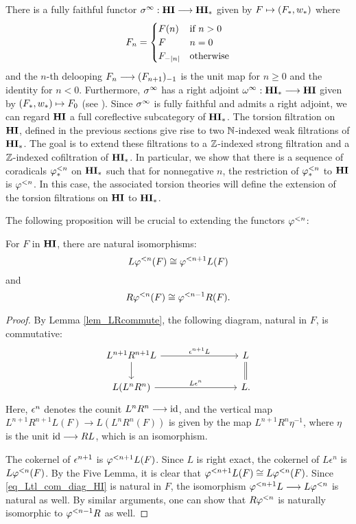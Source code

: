 There is a fully faithful functor $\spectHI: \HI \to \HM$ given
by $F \mapsto (F_*, \deloop_*)$ where
\[
F_n = \begin{cases}
F(n) &\textrm{if }n > 0 \\
F    &n = 0 \\
\RHI[|n|]F &\textrm{otherwise}
\end{cases}
\]
and the $n$-th delooping $F_n \to \RHI{(F_{n + 1})}$ is the unit
map for $n \geq 0$ and the identity for $n < 0$. Furthermore, 
$\spectHI$ has a right adjoint $\loopHM: \HM \to \HI$ given by 
$(F_*, \deloop_*) \mapsto F_0$ (see \cite[1.18]{DegModHom}). 
Since $\spectHI$ is fully faithful and admits a right adjoint, 
we can regard $\HI$ a full coreflective subcategory of $\HM$. The
torsion filtration on $\HI$, defined in the previous sections 
give rise to two $\N$-indexed weak filtrations of $\HM$. The goal 
is to extend these filtrations to a $\Z$-indexed strong filtration 
and a $\Z$-indexed cofiltration of $\HM$. In particular, we show
that there is a sequence of coradicals $\tlHM{n}$
on $\HM$ such that for nonnegative $n$, the restriction of 
$\tlHM{n}$ to $\HI$ is $\tlHI{n}$. In this case, the associated
torsion theories will define the extension of the torsion 
filtrations on $\HI$ to $\HM$.

The following proposition will be crucial to extending the 
functors $\tlHI{n}$:

\begin{prop}\label{prop_tl_L_R}
For $F$ in $\HI$, there are natural isomorphisms:
\[
L \tlHI{n}(F) \cong \tlHI{n + 1} L(F)
\]
and
\[
R\tlHI{n}(F) \cong \tlHI{n - 1}R(F).
\] 
\end{prop}
\begin{proof}
By Lemma \ref{lem_LRcommute}, the following diagram, natural in $F$, 
is commutative:
\begin{equation}\label{eq_Ltl_com_diag_HI}
\begin{tikzcd}[column sep=80pt]
L^{n + 1}R^{n + 1}L \arrow{r}{\cuHI^{n + 1}L} \arrow{d} &
L \arrow[equals]{d} \\
L(L^{n}R^n) \arrow{r}{L\cuHI^{n}} &
L.
\end{tikzcd}
\end{equation}
Here, $\cuHI^n$ denotes the counit $L^nR^n \to \id$,
and the vertical map $L^{n + 1}R^{n + 1}L(F) \to L(L^nR^n (F))$ is 
given by the map $L^{n + 1}R^n \eta^{-1}$, where $\eta$ is
the unit $\id \to RL$, which is an isomorphism.

The cokernel of $\cuHI^{n + 1}$ is $\tlHI{n + 1}L(F)$. Since $L$ 
is right exact, the cokernel of $L\epsilon^n$ is $L\tlHI{n}(F)$. 
By the Five Lemma, it is clear that $\tlHI{n + 1}L(F) \cong 
L\tlHI{n}(F)$. Since \eqref{eq_Ltl_com_diag_HI} is natural in $F$,
the isomorphism $\tlHI{n + 1}L \to L\tlHI{n}$ is natural as well.
By similar arguments, one can show that $R\tlHI{n}$ is naturally
isomorphic to $\tlHI{n - 1}R$ as well.
\end{proof}

